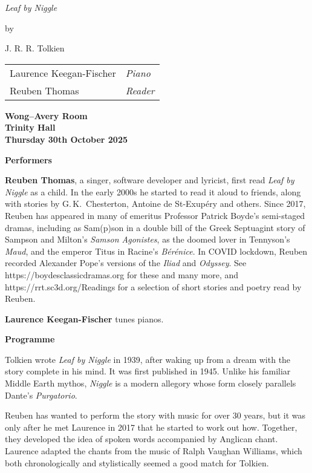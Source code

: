 \documentclass[10pt,british]{article}
\newcommand{\mysection}[1]%
  {\centerline{\normalfont\large\bfseries#1}\bigskip}
\begin{document}
\pagestyle{empty}
\begin{bfseries}
\vspace*{2cm}\bigskip\bigskip
\centerline{\huge \emph{Leaf by Niggle}}
\bigskip\bigskip
\centerline{\LARGE by}
\bigskip\bigskip
\centerline{\huge J. R. R. Tolkien}
\bigskip\bigskip
\end{bfseries}
\vspace{3cm}
{\Large\bfseries
\begin{center}
\renewcommand{\arraystretch}{1.5}
\begin{tabularx}{0.8\linewidth}{Xl}
  Laurence Keegan-Fischer & \emph{Piano} \\
  Reuben Thomas & \emph{Reader} \\
\end{tabularx}
\end{center}
}
\vspace{1cm}
\begin{center}
\bfseries
Wong--Avery Room \\ Trinity Hall \\ Thursday 30th October 2025 \\
\end{center}
\pagebreak

\mysection{Performers}

\noindent \textbf{Reuben Thomas}, a singer, software developer and lyricist, first read \emph{Leaf by Niggle} as a child. In the early 2000s he started to read it aloud to friends, along with stories by G.\,K.~Chesterton, Antoine de St-Exupéry and others. Since 2017, Reuben has appeared in many of emeritus Professor Patrick Boyde’s semi-staged dramas, including as Sam(p)son in a double bill of the Greek Septuagint story of Sampson and Milton’s \emph{Samson Agonistes}, as the doomed lover in Tennyson’s \emph{Maud}, and the emperor Titus in Racine’s \emph{Bérénice}. In COVID lockdown, Reuben recorded Alexander Pope’s versions of the \emph{Iliad} and \emph{Odyssey}. See https://boydesclassicdramas.org for these and many more, and https://rrt.sc3d.org/Readings for a selection of short stories and poetry read by Reuben.

\bigskip

\noindent \textbf{Laurence Keegan-Fischer} tunes pianos.

\vspace{1cm}
\mysection{Programme}

\noindent Tolkien wrote \emph{Leaf by Niggle} in 1939, after waking up from a dream with the story complete in his mind. It was first published in 1945. Unlike his familiar Middle Earth mythos, \emph{Niggle} is a modern allegory whose form closely parallels Dante’s \emph{Purgatorio}.

Reuben has wanted to perform the story with music for over 30 years, but it was only after he met Laurence in 2017 that he started to work out how. Together, they developed the idea of spoken words accompanied by Anglican chant. Laurence adapted the chants from the music of Ralph Vaughan Williams, which both chronologically and stylistically seemed a good match for Tolkien.
\end{document}
